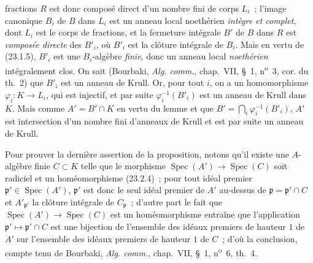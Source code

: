 fractions $R$ est donc composé direct d'un nombre fini de corps $L_i$~;
l'image canonique $B_i$ de $B$ dans $L_i$ est un anneau local noethérien
\emph{intègre et complet}, dont $L_i$ est le corps de fractions, et la
fermeture intégrale $B'$ de $B$ dans $R$ est \emph{composée directe} des
$B'_i$, où $B'_i$ est la clôture intégrale de $B_i$. Mais en vertu de
(23.1.5), $B'_i$ est une $B_i$-algèbre \emph{finie}, donc un anneau local
\emph{noethérien} intégralement clos. On sait (Bourbaki,
\emph{Alg. comm.}, chap.~VII, §~1, n\textsuperscript{o}~3, cor. du th.~2) que
$B'_i$ est un anneau de Krull. Or, pour tout $i$, on a un homomorphisme
$\varphi_i:K\to L_i$, qui est injectif, et par suite
$\varphi_i^{-1}(B'_i)$ est un anneau de Krull dans $K$. Mais comme
$A'=B'\cap K$ en vertu du lemme et que
$B'=\bigcap_i\varphi_i^{-1}(B'_i)$, $A'$ est intersection d'un nombre fini
d'anneaux de Krull et est par suite un anneau de Krull.

Pour prouver la dernière assertion de la proposition, notons qu'il existe une
$A$-algèbre finie $C\subset K$ telle que le morphisme
$\operatorname{Spec}(A')\to\operatorname{Spec}(C)$ soit radiciel et un
homéomorphisme (23.2.4)~; pour tout idéal premier
$\mathfrak p'\in\operatorname{Spec}(A')$, $\mathfrak p'$ est donc le seul
idéal premier de $A'$ au-dessus de $\mathfrak p=\mathfrak p'\cap C$ et
$A'_{\mathfrak p'}$ la clôture intégrale de $C_{\mathfrak p}$~; d'autre part
le fait que $\operatorname{Spec}(A')\to\operatorname{Spec}(C)$ est un
homéomorphisme entraîne que l'application
$\mathfrak p'\mapsto\mathfrak p'\cap C$ est une bijection de l'ensemble des
idéaux premiers de hauteur $1$ de $A'$ sur l'ensemble des idéaux premiers de
hauteur $1$ de $C$~; d'où la conclusion, compte tenu de Bourbaki,
\emph{Alg. comm.}, chap.~VII, §~1, n\textsuperscript{o}~6, th.~4.

